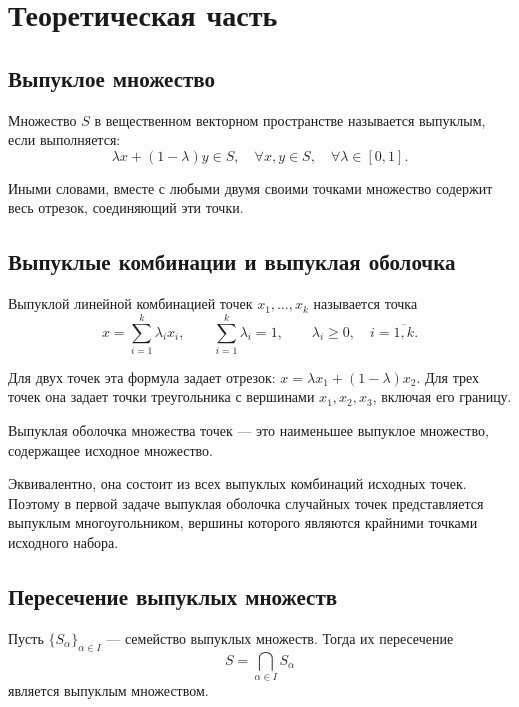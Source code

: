 \section{Теоретическая часть}

\subsection{Выпуклое множество}

\begin{definition}
\label{dfn:convex_set}
Множество $S$ в вещественном векторном пространстве называется выпуклым, если выполняется: 
\[
	\lambda x+(1-\lambda)y\in S, \quad \forall x,y\in S, \quad \forall \lambda\in[0,1].
\]
\end{definition}
Иными словами, вместе с любыми двумя своими точками множество содержит весь отрезок, соединяющий эти точки.

\subsection{Выпуклые комбинации и выпуклая оболочка}

\begin{definition}
Выпуклой линейной комбинацией точек $x_1,\ldots,x_k$ называется точка
\[
x=\sum_{i=1}^{k}\lambda_i x_i,
\qquad
\sum_{i=1}^{k}\lambda_i=1,
\qquad
\lambda_i\geq 0,\quad i=\overline{1,k}.
\]
\end{definition}

Для двух точек эта формула задает отрезок: $x=\lambda x_1+(1-\lambda)x_2$. Для трех точек она задает точки треугольника с вершинами $x_1,x_2,x_3$, включая его границу.

\begin{definition}
	Выпуклая оболочка множества точек --- это наименьшее выпуклое множество, содержащее исходное множество.
\end{definition}
 Эквивалентно, она состоит из всех выпуклых комбинаций исходных точек. Поэтому в первой задаче выпуклая оболочка случайных точек представляется выпуклым многоугольником, вершины которого являются крайними точками исходного набора.
\subsection{Пересечение выпуклых множеств}

\begin{theorem}
\label{thm:intersection}
Пусть $\{S_\alpha\}_{\alpha\in I}$ --- семейство выпуклых множеств.
Тогда их пересечение
\[
    S=\bigcap_{\alpha\in I} S_\alpha
\]
является выпуклым множеством.
\end{theorem}

